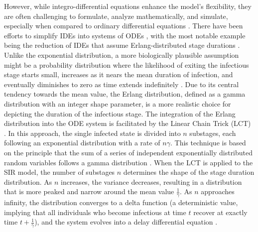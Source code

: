 \documentclass[12pt]{article}
\begin{document}
However, while integro-differential equations enhance the model's flexibility, they are often challenging to formulate, analyze mathematically, and simulate, especially when compared to ordinary differential equations \cite{krylova2013effects}\cite{hurtado2019generalizations}\cite{burton2005volterra}. There have been efforts to simplify IDEs into systems of ODEs \cite{macdonald2008biological}\cite{ponosov2004thew}\cite{burton2005volterra}\cite{goltser2013reducing}\cite{diekmann2018finite}, with the most notable example being the reduction of IDEs that assume Erlang-distributed stage durations \cite{hurtado2019generalizations}. Unlike the exponential distribution, a more biologically plausible assumption might be a probability distribution where the likelihood of exiting the infectious stage starts small, increases as it nears the mean duration of infection, and eventually diminishes to zero as time extends indefinitely \cite{sartwell1966incubation}\cite{bailey1954statistical}. Due to its central tendency towards the mean value, the Erlang distribution, defined as a gamma distribution with an integer shape parameter, is a more realistic choice for depicting the duration of the infectious stage. The integration of the Erlang distribution into the ODE system is facilitated by the Linear Chain Trick (LCT) \cite{macdonald1978time}\cite{smith2011introduction}. In this approach, the single infected state is divided into $n$ substages, each following an exponential distribution with a rate of $n\gamma$. This technique is based on the principle that the sum of a series of independent exponentially distributed random variables follows a gamma distribution \cite{krylova2013effects}\cite{therrien2018probability}. When the LCT is applied to the SIR model, the number of substages $n$ determines the shape of the stage duration distribution. As $n$ increases, the variance decreases, resulting in a distribution that is more peaked and narrow around the mean value $\frac{1}{\gamma}$. As $n$ approaches infinity, the distribution converges to a delta function (a deterministic value, implying that all individuals who become infectious at time $t$ recover at exactly time $t + \frac{1}{\gamma}$), and the system evolves into a delay differential equation \cite{krylova2013effects}\cite{hethcote1980integral}.
\end{document}

